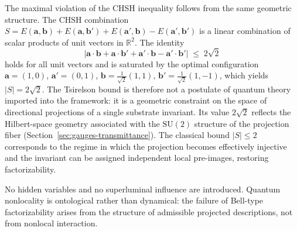   The maximal violation of the CHSH inequality follows from the same geometric structure.
  The CHSH combination
  $S = E(\mathbf{a},\mathbf{b}) + E(\mathbf{a},\mathbf{b}') +
  E(\mathbf{a}',\mathbf{b}) - E(\mathbf{a}',\mathbf{b}')$
  is a linear combination of scalar products of unit vectors in $\mathbb{R}^2$.
  The identity
  \begin{equation}
    \bigl|\mathbf{a}\cdot\mathbf{b} + \mathbf{a}\cdot\mathbf{b}'
    + \mathbf{a}'\cdot\mathbf{b} - \mathbf{a}'\cdot\mathbf{b}'\bigr|
    \;\leq\; 2\sqrt{2}
    \label{eq:Tsirelson-geom}
  \end{equation}
  holds for all unit vectors and is saturated by the optimal configuration
  $\mathbf{a} = (1,0)$, $\mathbf{a}' = (0,1)$,
  $\mathbf{b} = \tfrac{1}{\sqrt{2}}(1,1)$, $\mathbf{b}' = \tfrac{1}{\sqrt{2}}(1,-1)$,
  which yields $|S| = 2\sqrt{2}$.
  The Tsirelson bound is therefore not a postulate of quantum theory imported into
  the framework: it is a geometric constraint on the space of directional projections
  of a single substrate invariant.
  Its value $2\sqrt{2}$ reflects the Hilbert-space geometry associated with the
  $\mathrm{SU}(2)$ structure of the projection fiber (Section~\ref{sec:gauges-transmittance}).
  The classical bound $|S| \leq 2$ corresponds to the regime in which the
  projection becomes effectively injective and the invariant can be assigned
  independent local pre-images, restoring factorizability.

  No hidden variables and no superluminal influence are introduced.
  Quantum nonlocality is ontological rather than dynamical: the failure of
  Bell-type factorizability arises from the structure of admissible projected descriptions, not from nonlocal
  interaction.

